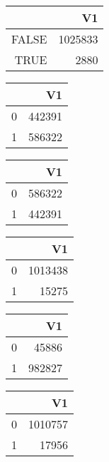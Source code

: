 \bigskip\bigskip
\centering
\begin{tabular}{rr}
  \hline
 & V1 \\ 
  \hline
FALSE & 1025833 \\ 
  TRUE & 2880 \\ 
   \hline
\end{tabular}

\bigskip\bigskip
\centering
\begin{tabular}{rr}
  \hline
 & V1 \\ 
  \hline
0 & 442391 \\ 
  1 & 586322 \\ 
   \hline
\end{tabular}

\bigskip\bigskip
\centering
\begin{tabular}{rr}
  \hline
 & V1 \\ 
  \hline
0 & 586322 \\ 
  1 & 442391 \\ 
   \hline
\end{tabular}

\bigskip\bigskip
\centering
\begin{tabular}{rr}
  \hline
 & V1 \\ 
  \hline
0 & 1013438 \\ 
  1 & 15275 \\ 
   \hline
\end{tabular}

\bigskip\bigskip
\centering
\begin{tabular}{rr}
  \hline
 & V1 \\ 
  \hline
0 & 45886 \\ 
  1 & 982827 \\ 
   \hline
\end{tabular}

\bigskip\bigskip
\centering
\begin{tabular}{rr}
  \hline
 & V1 \\ 
  \hline
0 & 1010757 \\ 
  1 & 17956 \\ 
   \hline
\end{tabular}

